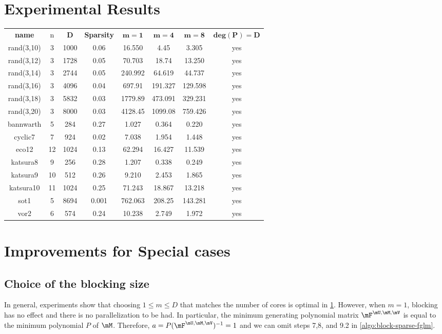 \documentclass[12pt]{article}
\begin{document}
\section{Experimental Results}\label{section:ex}
\bgroup
\def\arraystretch{2}
\setlength\tabcolsep{10pt}
\begin{center}
\begin{tabular}{c|c|c|c|c|c|c|c}
	\textbf{name}& n& $\mathbf{D}$ & \textbf{Sparsity} & $\mathbf{m = 1}$ & $\mathbf{m = 4}$ & $\mathbf{m = 8}$ & $\mathbf{deg(P) = D}$\\
	\cline{1-8}
	rand(3,10)&3 & 1000& 0.06  & 16.550  & 4.45    & 3.305   & yes \\
	rand(3,12)&3 & 1728& 0.05  & 70.703  & 18.74   & 13.250  & yes \\
	rand(3,14)&3 & 2744& 0.05  & 240.992 & 64.619  & 44.737  & yes \\
	rand(3,16)&3 & 4096& 0.04  & 697.91  & 191.327 & 129.598 & yes \\
	rand(3,18)&3 & 5832& 0.03  & 1779.89 & 473.091 & 329.231 & yes \\
	rand(3,20)&3 & 8000& 0.03  & 4128.45 & 1099.08 & 759.426 & yes \\
	bannwarth &5 & 284 & 0.27  & 1.027   & 0.364   & 0.220   & yes \\
	cyclic7   &7 & 924 & 0.02  & 7.038   & 1.954   & 1.448   & yes \\
	eco12     &12& 1024& 0.13  & 62.294  & 16.427  & 11.539  & yes \\
	katsura8  &9 & 256 & 0.28  & 1.207   & 0.338   & 0.249   & yes \\
	katsura9  &10& 512 & 0.26  & 9.210   & 2.453   & 1.865   & yes \\
	katsura10 &11& 1024& 0.25  & 71.243  & 18.867  & 13.218  & yes \\
	sot1      &5 & 8694& 0.001 & 762.063 & 208.25  & 143.281 & yes \\
	vor2      &6 & 574 & 0.24   & 10.238  & 2.749   & 1.972   & yes 
\end{tabular}
\end{center}

\newpage
\section{Improvements for Special cases}
\subsection{Choice of the blocking size}
In general, experiments show that choosing $1 \le m \le D$ that matches
the number of cores is optimal in \cref{section:ex}. However,
when $m=1$, blocking has no effect and there is no parallelization
to be had. In particular, the minimum generating polynomial matrix
$\mF^{\mU,\mM,\mV}$ is equal to the minimum polynomial $P$ of $\mM$. Therefore,
$a = P (\mF^{\mU,\mM,\mV})^{-1} = 1$ and we can omit steps 7,8, and 9.2 in
\cref{algo:block-sparse-fglm}.
\end{document}
